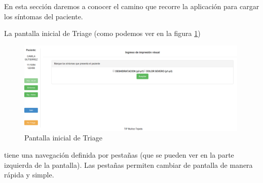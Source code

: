 En esta sección daremos a conocer el camino que recorre la aplicación para cargar los síntomas del paciente.

La pantalla inicial de Triage (como podemos ver en la figura \ref{fig:triage_inicial}) 
\begin{figure}
\centerline{\includegraphics[width=0.99\textwidth]{impresion_visual.png}}
\caption{Pantalla inicial de Triage} \label{fig:triage_inicial}
\end{figure}
tiene una navegación definida por pestañas (que se pueden ver en la parte izquierda de la pantalla). Las pestañas permiten cambiar de pantalla de manera rápida y simple.

